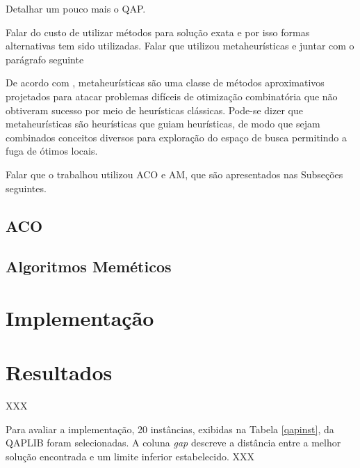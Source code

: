 Detalhar um pouco mais o QAP.

Falar do custo de utilizar métodos para solução exata e
por isso formas alternativas tem sido utilizadas.
Falar que utilizou metaheurísticas e juntar com o parágrafo seguinte

De acordo com \cite{metatheory}, metaheurísticas são uma
classe de métodos aproximativos projetados para atacar problemas
difíceis de otimização combinatória que não obtiveram sucesso por meio
de heurísticas clássicas. Pode-se dizer que metaheurísticas são
heurísticas que guiam heurísticas, de modo que sejam combinados
conceitos diversos para exploração do espaço de busca permitindo a
fuga de ótimos locais.

Falar que o trabalhou utilizou ACO e AM, que são apresentados nas
Subseções seguintes.

\subsection{ACO}

\subsection{Algoritmos Meméticos}



\section{Implementação}



\section{Resultados}

XXX

Para avaliar a implementação, 20 instâncias, exibidas na Tabela
\ref{qapinst}, da QAPLIB \cite{qaplib} foram selecionadas. A coluna
\textit{gap} descreve a distância entre a melhor solução encontrada e
um limite inferior estabelecido. XXX

